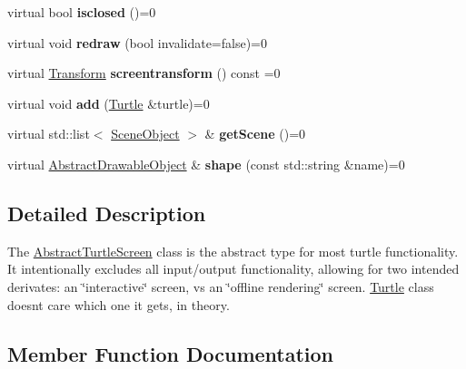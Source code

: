 \begin{DoxyCompactItemize}
\mbox{\label{classcturtle_1_1AbstractTurtleScreen_a5a68db439eb8e5016a290529d62610f5}} 
virtual bool {\bfseries isclosed} ()=0
\item 
\mbox{\label{classcturtle_1_1AbstractTurtleScreen_a6bf8b7618ccd22087cc4fcb95d9e2ac5}} 
virtual void {\bfseries redraw} (bool invalidate=false)=0
\item 
\mbox{\label{classcturtle_1_1AbstractTurtleScreen_a602b6058a1d56e27700155987b791056}} 
virtual \hyperlink{classcturtle_1_1Transform}{Transform} {\bfseries screentransform} () const =0
\item 
\mbox{\label{classcturtle_1_1AbstractTurtleScreen_aa82ae80751e1f6f71b07d2c0ba72e5e8}} 
virtual void {\bfseries add} (\hyperlink{classcturtle_1_1Turtle}{Turtle} \&turtle)=0
\item 
\mbox{\label{classcturtle_1_1AbstractTurtleScreen_ab4524119329c3ab3ce2a9a864ec87437}} 
virtual std\+::list$<$ \hyperlink{structcturtle_1_1SceneObject}{Scene\+Object} $>$ \& {\bfseries get\+Scene} ()=0
\item 
\mbox{\label{classcturtle_1_1AbstractTurtleScreen_a63ad1c2ec491e0a8773fc53aac0b9c3a}} 
virtual \hyperlink{classcturtle_1_1AbstractDrawableObject}{Abstract\+Drawable\+Object} \& {\bfseries shape} (const std\+::string \&name)=0
\end{DoxyCompactItemize}


\subsection{Detailed Description}
The \hyperlink{classcturtle_1_1AbstractTurtleScreen}{Abstract\+Turtle\+Screen} class is the abstract type for most turtle functionality. It intentionally excludes all input/output functionality, allowing for two intended derivates\+: an \char`\"{}interactive\char`\"{} screen, vs an \char`\"{}offline rendering\char`\"{} screen. \hyperlink{classcturtle_1_1Turtle}{Turtle} class doesn\textquotesingle{}t care which one it gets, in theory. 

\subsection{Member Function Documentation}
\mbox{\label{classcturtle_1_1AbstractTurtleScreen_abae240a2ba949c1628bb01ad850fb32b}} 
